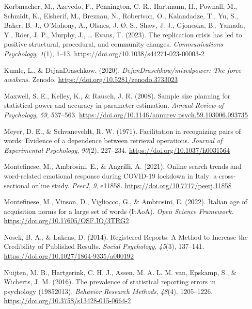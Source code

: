 \documentclass[
  man]{apa7}
\newlength{\cslhangindent}
\newlength{\cslentryspacingunit} %
\newenvironment{CSLReferences}[2] %
 {%
  \setlength{\parindent}{0pt}
  \ifodd #1
  \let\oldpar\par
  \def\par{\hangindent=\cslhangindent\oldpar}
  \fi
  \setlength{\parskip}{#2\cslentryspacingunit}
 }%
 {}
\begin{document}
\begin{CSLReferences}{1}{0}
\leavevmode{}%
Korbmacher, M., Azevedo, F., Pennington, C. R., Hartmann, H., Pownall, M., Schmidt, K., Elsherif, M., Breznau, N., Robertson, O., Kalandadze, T., Yu, S., Baker, B. J., O'Mahony, A., Olsnes, J. Ø.-S., Shaw, J. J., Gjoneska, B., Yamada, Y., Röer, J. P., Murphy, J., \ldots{} Evans, T. (2023). The replication crisis has led to positive structural, procedural, and community changes. \emph{Communications Psychology}, \emph{1}(1), 1--13. \url{https://doi.org/10.1038/s44271-023-00003-2}

\leavevmode{}%
Kumle, L., \& DejanDraschkow. (2020). \emph{DejanDraschkow/mixedpower: The force awakens}. Zenodo. \url{https://doi.org/10.5281/zenodo.3733023}

\leavevmode{}%
Maxwell, S. E., Kelley, K., \& Rausch, J. R. (2008). Sample size planning for statistical power and accuracy in parameter estimation. \emph{Annual Review of Psychology}, \emph{59}, 537--563. \url{https://doi.org/10.1146/annurev.psych.59.103006.093735}

\leavevmode{}%
Meyer, D. E., \& Schvaneveldt, R. W. (1971). Facilitation in recognizing pairs of words: Evidence of a dependence between retrieval operations. \emph{Journal of Experimental Psychology}, \emph{90}(2), 227--234. \url{https://doi.org/10.1037/h0031564}

\leavevmode{}%
Montefinese, M., Ambrosini, E., \& Angrilli, A. (2021). Online search trends and word-related emotional response during COVID-19 lockdown in Italy: a cross-sectional online study. \emph{PeerJ}, \emph{9}, e11858. \url{https://doi.org/10.7717/peerj.11858}

\leavevmode{}%
Montefinese, M., Vinson, D., Vigliocco, G., \& Ambrosini, E. (2022). Italian age of acquisition norms for a large set of words (ItAoA). \emph{Open Science Framework}. \url{https://doi.org/10.17605/OSF.IO/3TRG2}

\leavevmode{}%
Nosek, B. A., \& Lakens, D. (2014). Registered Reports: A Method to Increase the Credibility of Published Results. \emph{Social Psychology}, \emph{45}(3), 137--141. \url{https://doi.org/10.1027/1864-9335/a000192}

\leavevmode{}%
Nuijten, M. B., Hartgerink, C. H. J., Assen, M. A. L. M. van, Epskamp, S., \& Wicherts, J. M. (2016). The prevalence of statistical reporting errors in psychology (1985{\textendash}2013). \emph{Behavior Research Methods}, \emph{48}(4), 1205--1226. \url{https://doi.org/10.3758/s13428-015-0664-2}


\end{CSLReferences}
\end{document}
